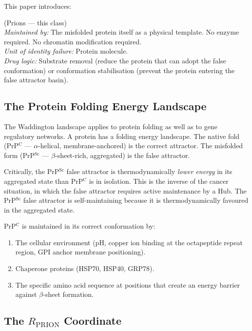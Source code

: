 \documentclass[12pt,a4paper]{article}
\newcommand{\rprion}{$R_{\mathrm{PRION}}$}
\newcommand{\prpc}{PrP$^{\mathrm{C}}$}
\newcommand{\prpsc}{PrP$^{\mathrm{Sc}}$}
\begin{document}
This paper introduces:

\begin{description}[leftmargin=2em]
  \item[\textbf{Class~2 --- Protein Conformational False Attractor}]
    (Prions --- this class)\\
    \textit{Maintained by:} The misfolded protein itself as a physical
    template. No enzyme required. No chromatin modification required.\\
    \textit{Unit of identity failure:} Protein molecule.\\
    \textit{Drug logic:} Substrate removal (reduce the protein that can
    adopt the false conformation) or conformation stabilisation (prevent
    the protein entering the false attractor basin).
\end{description}

\subsection{The Protein Folding Energy Landscape}

The Waddington landscape applies to protein folding as well as to gene
regulatory networks. A protein has a folding energy landscape. The native
fold (\prpc{} --- $\alpha$-helical, membrane-anchored) is the correct
attractor. The misfolded form (\prpsc{} --- $\beta$-sheet-rich, aggregated)
is the false attractor.

Critically, the \prpsc{} false attractor is thermodynamically \textit{lower
energy} in its aggregated state than \prpc{} is in isolation. This is the
inverse of the cancer situation, in which the false attractor requires active
maintenance by a Hub. The \prpsc{} false attractor is self-maintaining
because it is thermodynamically favoured in the aggregated state.

\prpc{} is maintained in its correct conformation by:
\begin{enumerate}
  \item The cellular environment (pH, copper ion binding at the octapeptide
    repeat region, GPI anchor membrane positioning).
  \item Chaperone proteins (HSP70, HSP40, GRP78).
  \item The specific amino acid sequence at positions that create an energy
    barrier against $\beta$-sheet formation.
\end{enumerate}

\subsection{The \rprion{} Coordinate}
\end{document}

